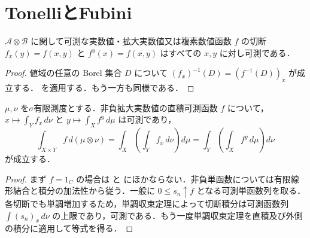 \section{TonelliとFubini}
\begin{prop}[可測函数の切断]
$\mathcal A\otimes\mathcal B$ に関して可測な実数値・拡大実数値又は複素数値函数 $f$ の切断 $f_x(y)=f(x,y)$ と $f^y(x)=f(x,y)$ はすべての $x,y$ に対し可測である．
\end{prop}
\begin{proof}
値域の任意の Borel 集合 $D$ について $(f_x)^{-1}(D)=(f^{-1}(D))_x$ が成立する． を適用する．もう一方も同様である．
\end{proof}
\begin{prop}[Tonelliの定理]
$\mu,\nu$ を$\sigma$有限測度とする．非負拡大実数値の直積可測函数 $f$ について，$x\mapsto\int_Y f_x\,d\nu$ と $y\mapsto\int_X f^y\,d\mu$ は可測であり，
\[
\int_{X\times Y}f\,d(\mu\otimes\nu)=\int_X\left(\int_Y f_x\,d\nu\right)d\mu=\int_Y\left(\int_X f^y\,d\mu\right)d\nu
\]
が成立する．
\end{prop}
\begin{proof}
まず $f=1_C$ の場合は  と  にほかならない．非負単函数については有限線形結合と積分の加法性から従う．一般に $0\leq s_n\uparrow f$ となる可測単函数列を取る．各切断でも単調増加するため，単調収束定理によって切断積分は可測函数列 $\int(s_n)_x\,d\nu$ の上限であり，可測である．もう一度単調収束定理を直積及び外側の積分に適用して等式を得る．
\end{proof}
